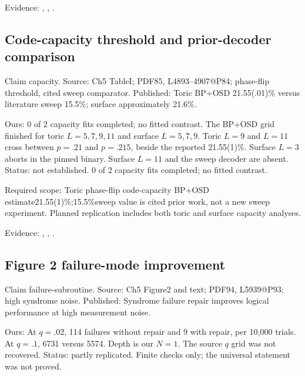 Evidence: \href{https://github.com/alectionary/vibe-math/blob/master/formalization/quintavalle-hgp/sources/browser-extraction.txt}{}, \href{https://github.com/alectionary/vibe-math/blob/master/formalization/quintavalle-hgp/availability.md}{}, \href{https://github.com/alectionary/vibe-math/blob/master/formalization/quintavalle-hgp/results/original_pilots.json}{}.
\subsection{Code-capacity threshold and prior-decoder comparison}\label{claim:capacity}
Claim capacity. Source: Ch5 TableI; PDF85, L4893--4907@P84; phase-flip threshold, cited sweep comparator. Published: Toric BP+OSD 21.55(.01)\% versus literature sweep 15.5\%; surface approximately 21.6\%.

Ours: 0 of 2 capacity fits completed; no fitted contrast. The BP+OSD grid finished for toric $L=5,7,9,11$ and surface $L=5,7,9$. Toric $L=9$ and $L=11$ cross between $p=.21$ and $p=.215$, beside the reported 21.55(1)\%. Surface $L=3$ aborts in the pinned binary. Surface $L=11$ and the sweep decoder are absent. Status: not established. 0 of 2 capacity fits completed; no fitted contrast.

Required scope: Toric phase-flip code-capacity BP+OSD estimate21.55(1)\%;15.5\%sweep value is cited prior work, not a new sweep experiment. Planned replication includes both toric and surface capacity analyses.

Evidence: \href{https://github.com/alectionary/vibe-math/blob/master/formalization/quintavalle-hgp/sources/browser-extraction.txt}{}, \href{https://github.com/alectionary/vibe-math/blob/master/formalization/quintavalle-hgp/availability.md}{}, \href{https://github.com/alectionary/vibe-math/blob/master/formalization/quintavalle-hgp/results/original_pilots.json}{}.
\subsection{Figure 2 failure-mode improvement}\label{claim:failure-subroutine}
Claim failure-subroutine. Source: Ch5 Figure2 and text; PDF94, L5939@P93; high syndrome noise. Published: Syndrome failure repair improves logical performance at high measurement noise.

Ours: At $q=.02$, 114 failures without repair and 9 with repair, per 10,000 trials. At $q=.1$, 6731 versus 5574. Depth is our $N=1$. The source $q$ grid was not recovered. Status: partly replicated. Finite checks only; the universal statement was not proved.

